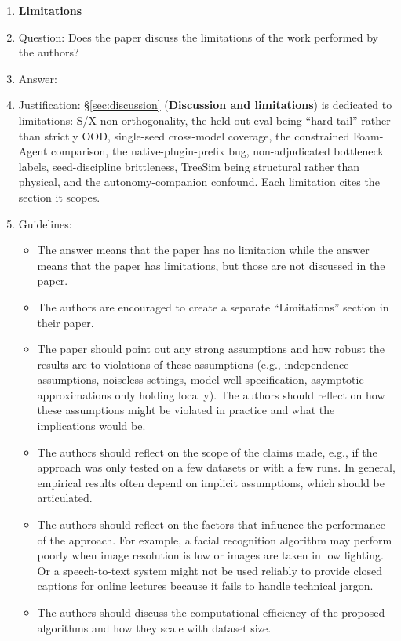 \begin{enumerate}
\item {\bf Limitations}
    \item[] Question: Does the paper discuss the limitations of the work performed by the authors?
    \item[] Answer: \answerYes{}
    \item[] Justification: \S\ref{sec:discussion} (\textbf{Discussion and limitations}) is dedicated to limitations: S/X non-orthogonality, the held-out-eval being ``hard-tail'' rather than strictly OOD, single-seed cross-model coverage, the constrained Foam-Agent comparison, the native-plugin-prefix bug, non-adjudicated bottleneck labels, seed-discipline brittleness, TreeSim being structural rather than physical, and the autonomy-companion confound. Each limitation cites the section it scopes.
    \item[] Guidelines:
    \begin{itemize}
        \item The answer \answerNA{} means that the paper has no limitation while the answer \answerNo{} means that the paper has limitations, but those are not discussed in the paper.
        \item The authors are encouraged to create a separate ``Limitations'' section in their paper.
        \item The paper should point out any strong assumptions and how robust the results are to violations of these assumptions (e.g., independence assumptions, noiseless settings, model well-specification, asymptotic approximations only holding locally). The authors should reflect on how these assumptions might be violated in practice and what the implications would be.
        \item The authors should reflect on the scope of the claims made, e.g., if the approach was only tested on a few datasets or with a few runs. In general, empirical results often depend on implicit assumptions, which should be articulated.
        \item The authors should reflect on the factors that influence the performance of the approach. For example, a facial recognition algorithm may perform poorly when image resolution is low or images are taken in low lighting. Or a speech-to-text system might not be used reliably to provide closed captions for online lectures because it fails to handle technical jargon.
        \item The authors should discuss the computational efficiency of the proposed algorithms and how they scale with dataset size.

\end{itemize}
\end{enumerate}
